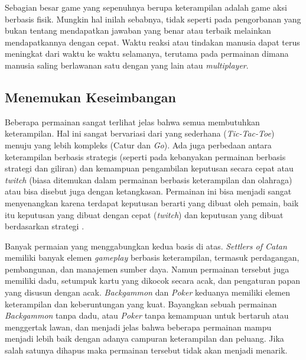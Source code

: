 \begin{subs}
\begin{enumerate}[label=\textbf{\alph*).}]
		Sebagian besar game yang sepenuhnya berupa keterampilan adalah game aksi berbasis fisik. Mungkin hal inilah sebabnya, tidak seperti pada pengorbanan yang bukan tentang mendapatkan jawaban yang benar atau terbaik melainkan mendapatkannya dengan cepat. Waktu reaksi atau tindakan manusia dapat terus meningkat dari waktu ke waktu selamanya, terutama pada permainan dimana manusia saling berlawanan satu dengan yang lain atau \textit{multiplayer}.
		\vspace{1ex}
	\end{enumerate}

	\subsection{Menemukan Keseimbangan}
	\label{sec:sub_sec2_keseimbangan}
	\vspace{1ex}
	
	Beberapa permainan sangat terlihat jelas bahwa semua membutuhkan keterampilan. Hal ini sangat bervariasi dari yang sederhana (\textit{Tic-Tac-Toe}) menuju yang lebih kompleks (Catur dan \textit{Go}). Ada juga perbedaan antara keterampilan berbasis strategis (seperti pada kebanyakan permainan berbasis strategi dan giliran) dan kemampuan pengambilan keputusan secara cepat atau \textit{twitch} (biasa ditemukan dalam permainan berbasis keterampilan dan olahraga) atau bisa disebut juga dengan ketangkasan. Permainan ini bisa menjadi sangat menyenangkan karena terdapat keputusan berarti yang dibuat oleh pemain, baik itu keputusan yang dibuat dengan cepat (\textit{twitch}) dan keputusan yang dibuat berdasarkan strategi \citep{Brathwaite2009}.
	\vspace{1ex}
	
	Banyak permaian yang menggabungkan kedua basis di atas. \textit{Settlers of Catan} memiliki banyak elemen \textit{gameplay} berbasis keterampilan, termasuk perdagangan, pembangunan, dan manajemen sumber daya. Namun permainan tersebut juga memiliki dadu, setumpuk kartu yang dikocok secara acak, dan pengaturan papan yang disusun dengan acak. \textit{Backgammon} dan \textit{Poker} keduanya memiliki elemen keterampilan dan keberuntungan yang kuat. Bayangkan sebuah permainan \textit{Backgammon} tanpa dadu, atau \textit{Poker} tanpa kemampuan untuk bertaruh atau menggertak lawan, dan menjadi jelas bahwa beberapa permainan mampu menjadi lebih baik dengan adanya campuran keterampilan dan peluang. Jika salah satunya dihapus maka permainan tersebut tidak akan menjadi menarik.
	\vspace{1ex}
	

\end{subs}
